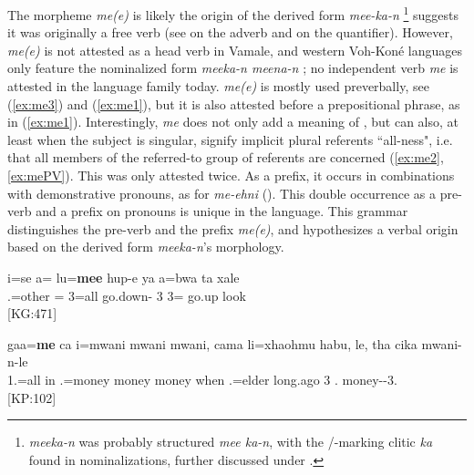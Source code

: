 The morpheme \textit{me(e)}  is likely the origin of the derived form \textit{mee-ka-n} \footnote{\textit{meeka-n} was probably structured \textit{mee ka-n}, with the /-marking clitic \textit{ka}  found in nominalizations, further discussed under .} suggests it was originally a free verb (see  on the adverb and  on the quantifier). However, \textit{me(e)} is not attested as a head verb in Vamale, and western Voh-Koné languages only feature the nominalized form \textit{meeka-n \goodtilde meena-n} \parencite[211]{rivierre_bwatoo_2006}; no independent verb \textit{me} is attested in the language family today. \textit{me(e)} is mostly used preverbally, see (\ref{ex:me3}) and (\ref{ex:me1}), but it is also attested before a prepositional phrase, as in (\ref{ex:me1}). Interestingly, \textit{me} does not only add a meaning of , but can also, at least when the subject is singular, signify implicit plural referents ``all-ness", i.e. that all members of the referred-to group of referents are concerned (\ref{ex:me2}, \ref{ex:mePV}). This was only attested twice.
As a prefix, it occurs in combinations with demonstrative pronouns, as for \textit{me-ehni}  (). This double occurrence as a pre-verb and a prefix on pronouns is unique in the language.
This grammar distinguishes the pre-verb and the prefix \textit{me(e)}, %
and hypothesizes a verbal origin based on the derived form \textit{meeka-n}'s morphology.


\ea\label{ex:me3}
\gll i=se a= lu=\textbf{mee} hup-e ya a=bwa ta xale\\ 
 .=other = 3=all go.down- 3 3= go.up look\\ 
\glt {} {[KG:471]}
\z


\ea\label{ex:me1}
\gll gaa=\textbf{me} ca i=mwani mwani mwani, cama li=xhaohmu habu, le, tha cika mwani-n-le\\ 
 1.=all in .=money money money when .=elder long.ago 3  . money--3.\\ 
\glt {} {[KP:102]}
\z

